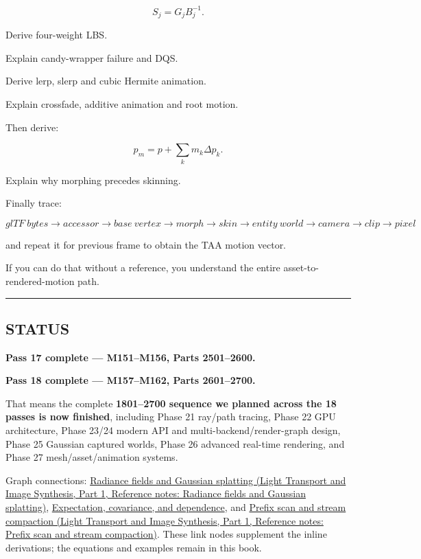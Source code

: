 \[
S_j=
G_jB_j^{-1}.
\]

Derive four-weight LBS.

Explain candy-wrapper failure and DQS.

Derive lerp, slerp and cubic Hermite animation.

Explain crossfade, additive animation and root motion.

Then derive:

\[
p_m=
p+
\sum_km_k\Delta p_k.
\]

Explain why morphing precedes skinning.

Finally trace:

\[
\boxed{
glTF\ bytes
\rightarrow
accessor
\rightarrow
base\ vertex
\rightarrow
morph
\rightarrow
skin
\rightarrow
entity\ world
\rightarrow
camera
\rightarrow
clip
\rightarrow
pixel
}
\]

and repeat it for previous frame to obtain the TAA motion vector.

If you can do that without a reference, you understand the entire asset-to-rendered-motion path.

\begin{center}\rule{0.5\linewidth}{0.5pt}\end{center}

\subsection{STATUS}\label{04-visual-computing-ii-ch041-status}

\hypertarget{04-visual-computing-ii-ch041-status}{}

\textbf{Pass 17 complete --- M151--M156, Parts 2501--2600.}

\textbf{Pass 18 complete --- M157--M162, Parts 2601--2700.}

That means the complete \textbf{1801--2700 sequence we planned across the 18 passes is now finished}, including Phase 21 ray/path tracing, Phase 22 GPU architecture, Phase 23/24 modern API and multi-backend/render-graph design, Phase 25 Gaussian captured worlds, Phase 26 advanced real-time rendering, and Phase 27 mesh/asset/animation systems.

Graph connections: \href{../04-Light-Transport-and-Image-Synthesis-P01/main.pdf\#appendix-c5b332e400e7}{Radiance fields and Gaussian splatting (Light Transport and Image Synthesis, Part 1, Reference notes: Radiance fields and Gaussian splatting)}, \hyperref[appendix-54c383df9992]{Expectation, covariance, and dependence}, and \href{../04-Light-Transport-and-Image-Synthesis-P01/main.pdf\#appendix-f2ee4d086415}{Prefix scan and stream compaction (Light Transport and Image Synthesis, Part 1, Reference notes: Prefix scan and stream compaction)}. These link nodes supplement the inline derivations; the equations and examples remain in this book.

